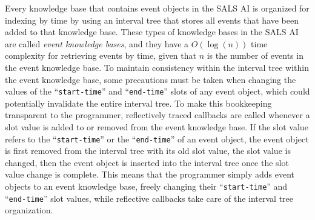 Every knowledge base that contains event objects in the SALS AI is
organized for indexing by time by using an interval tree that stores
all events that have been added to that knowledge base.  These types
of knowledge bases in the SALS AI are called {\emph{event knowledge
    bases}}, and they have a $O(\log{(n)})$ time complexity for
retrieving events by time, given that $n$ is the number of events in
the event knowledge base.  To maintain consistency within the interval
tree within the event knowledge base, some precautions must be taken
when changing the values of the ``{\tt{start-time}}'' and
``{\tt{end-time}}'' slots of any event object, which could potentially
invalidate the entire interval tree.  To make this bookkeeping
transparent to the programmer, reflectively traced callbacks are
called whenever a slot value is added to or removed from the event
knowledge base.  If the slot value refers to the ``{\tt{start-time}}''
or the ``{\tt{end-time}}'' of an event object, the event object is
first removed from the interval tree with its old slot value, the slot
value is changed, then the event object is inserted into the interval
tree once the slot value change is complete.  This means that the
programmer simply adds event objects to an event knowledge base,
freely changing their ``{\tt{start-time}}'' and ``{\tt{end-time}}''
slot values, while reflective callbacks take care of the interval tree
organization.

